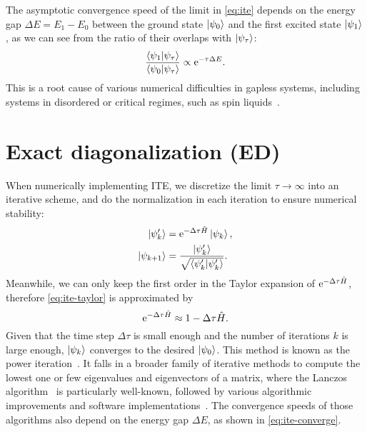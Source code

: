 The asymptotic convergence speed of the limit in \cref{eq:ite} depends on the energy gap $\Delta E = E_1 - E_0$ between the ground state $\ket{\psi_0}$ and the first excited state $\ket{\psi_1}$, as we can see from the ratio of their overlaps with $\ket{\psi_\tau}$:
\begin{equation}
\frac{\ip{\psi_1}{\psi_\tau}}{\ip{\psi_0}{\psi_\tau}} \propto \rme^{-\tau \Delta E}. \label{eq:ite-converge}
\end{equation}
This is a root cause of various numerical difficulties in gapless systems, including systems in disordered or critical regimes, such as spin liquids~\cite{misguich2010quantum, balents2010spin, mila2015frustrated}.

\vfill

\section{Exact diagonalization (ED)}
\label{sec:ed}

When numerically implementing ITE, we discretize the limit $\tau \to \infty$ into an iterative scheme, and do the normalization in each iteration to ensure numerical stability:
\begin{align}
\ket{\psi'_k} &= \rme^{-\Delta \tau \hat{H}} \ket{\psi_k}, \\
\ket{\psi_{k + 1}} &= \frac{\ket{\psi'_k}}{\sqrt{\ip{\psi'_k}}}.
\end{align}
Meanwhile, we can only keep the first order in the Taylor expansion of $\mathrm{e}^{-\Delta \tau \hat{H}}$, therefore \cref{eq:ite-taylor} is approximated by
\begin{equation}
\mathrm{e}^{-\Delta \tau \hat{H}} \approx 1 - \Delta \tau \hat{H}.
\end{equation}
Given that the time step $\Delta \tau$ is small enough and the number of iterations $k$ is large enough, $\ket{\psi_k}$ converges to the desired $\ket{\psi_0}$. This method is known as the power iteration~\cite{mises1929praktische}. It falls in a broader family of iterative methods to compute the lowest one or few eigenvalues and eigenvectors of a matrix, where the Lanczos algorithm~\cite{lanczos1950iteration} is particularly well-known, followed by various algorithmic improvements and software implementations~\cite{knyazev2001toward, stathopoulos2010primme}. The convergence speeds of those algorithms also depend on the energy gap $\Delta E$, as shown in \cref{eq:ite-converge}.

